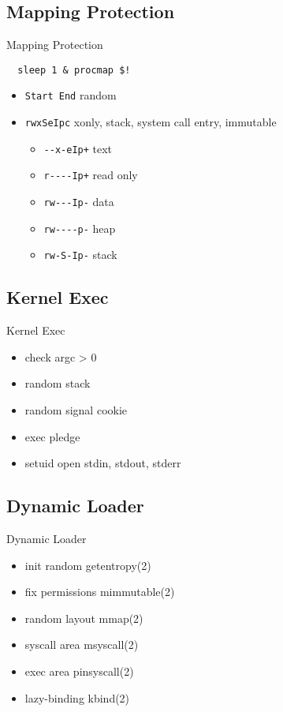\documentclass[14pt,aspectratio=169]{beamer}
\begin{document}
\subsection{Mapping Protection}
\begin{frame}[fragile=singleslide]{Mapping Protection}
\begin{verbatim}
  sleep 1 & procmap $!
\end{verbatim}
\begin{itemize}
  \item \verb/Start End/ random
  \item \verb/rwxSeIpc/ xonly, stack, system call entry, immutable
  \begin{itemize}
    \item \verb/--x-eIp+/ text
    \item \verb/r----Ip+/ read only
    \item \verb/rw---Ip-/ data
    \item \verb/rw----p-/ heap
    \item \verb/rw-S-Ip-/ stack
  \end{itemize}
\end{itemize}
\end{frame}

\subsection{Kernel Exec}
\begin{frame}{Kernel Exec}
\begin{itemize}
  \item check argc > 0
  \item random stack
  \item random signal cookie
  \item exec pledge
  \item setuid open stdin, stdout, stderr
\end{itemize}
\end{frame}

\subsection{Dynamic Loader}
\begin{frame}{Dynamic Loader}
\begin{itemize}
  \item init random getentropy(2)
  \item fix permissions mimmutable(2)
  \item random layout mmap(2)
  \item syscall area msyscall(2)
  \item exec area pinsyscall(2)
  \item lazy-binding kbind(2)
\end{itemize}
\end{frame}
\end{document}
